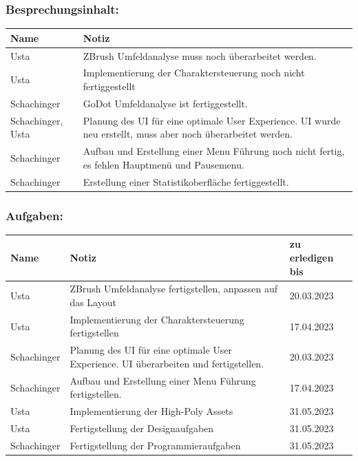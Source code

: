 \subsubsection*{Besprechungsinhalt:}
\begin{tabular}{|m{}|m{}|}
\hline
Name & Notiz \\
\hline
Usta & ZBrush Umfeldanalyse muss noch überarbeitet werden. \\
\hline
Usta & Implementierung der Charaktersteuerung noch nicht fertiggestellt \\
\hline
Schachinger & GoDot Umfeldanalyse ist fertiggestellt. \\
\hline
Schachinger, Usta & Planung des UI für eine optimale User Experience. UI wurde neu erstellt, muss aber noch überarbeitet werden. \\
\hline
Schachinger & Aufbau und Erstellung einer Menu Führung noch nicht fertig, es fehlen Hauptmenü und Pausemenu.\\
\hline
Schachinger & Erstellung einer Statistikoberfläche fertiggestellt. \\
\hline
\end{tabular}

\subsubsection*{Aufgaben:}
\begin{tabular}{|m{}|m{}|m{}|}
\hline
Name & Notiz & zu erledigen bis \\
\hline
Usta & ZBrush Umfeldanalyse fertigstellen, anpassen auf das Layout & 20.03.2023 \\
\hline
Usta & Implementierung der Charaktersteuerung fertigstellen & 17.04.2023 \\
\hline
Schachinger & Planung des UI für eine optimale User Experience. UI überarbeiten und fertigstellen. & 20.03.2023 \\
\hline
Schachinger & Aufbau und Erstellung einer Menu Führung fertigstellen. & 17.04.2023 \\
\hline
Usta & Implementierung der High-Poly Assets & 31.05.2023 \\
\hline
Usta & Fertigstellung der Designaufgaben & 31.05.2023 \\
\hline
Schachinger & Fertigstellung der Programmieraufgaben & 31.05.2023 \\
\hline
\end{tabular}

